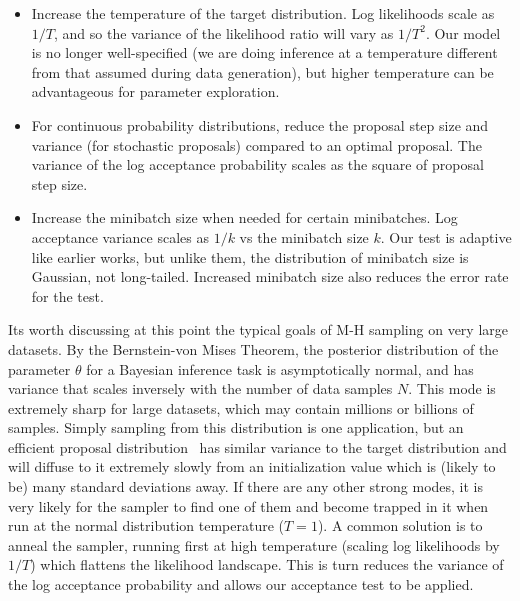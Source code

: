 \documentclass{article}
\begin{document}
\begin{itemize}
  
\item Increase the temperature of the target distribution. Log likelihoods
  scale as $1/T$, and so the variance of the likelihood ratio will
  vary as $1/T^2$. Our model is no longer well-specified (we are doing inference
  at a temperature different from that assumed during data generation), but
  higher temperature can be advantageous for parameter exploration.

\item For continuous probability distributions, reduce the proposal
  step size and variance (for stochastic proposals) compared to an optimal
  proposal. The variance of the log acceptance probability scales as the
  square of proposal step size. 

\item Increase the minibatch size when needed for certain
  minibatches. Log acceptance variance scales as $1/k$ vs the
  minibatch size $k$. Our test is adaptive like earlier works, but
  unlike them, the distribution of minibatch size is Gaussian, not
  long-tailed.  Increased minibatch size also reduces the error rate
  for the test.

\end{itemize}

Its worth discussing at this point the typical goals of
M-H sampling on very large datasets.  By the Bernstein-von Mises
Theorem, the posterior distribution of the parameter $\theta$ for a
Bayesian inference task is asymptotically normal, and has variance
that scales inversely with the number of data samples $N$. This mode
is extremely sharp for large datasets, which may contain millions or
billions of samples. Simply sampling from this distribution is one
application, but an efficient proposal distribution~\cite{OptimalScaling01} has similar variance to the target
distribution and will diffuse to it extremely slowly from an
initialization value which is (likely to be) many standard deviations
away. If there are any other strong modes, it is very likely for the
sampler to find one of them and become trapped in it when run at the
normal distribution temperature ($T=1$). A common solution is to anneal
the sampler, running first at high temperature (scaling log
likelihoods by $1/T$) which flattens the likelihood landscape.  This is
turn reduces the variance of the log acceptance probability and allows
our acceptance test to be applied.
\end{document}
